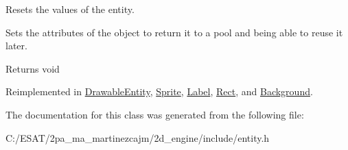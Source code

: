 Resets the values of the entity. 

Sets the attributes of the object to return it to a pool and being able to reuse it later.

\begin{DoxyReturn}{Returns}
void 
\end{DoxyReturn}


Reimplemented in \hyperlink{class_drawable_entity_aabea8715834f6cee7fd36b038d1a4843}{Drawable\+Entity}, \hyperlink{class_sprite_a26066db75daec637f436d4635418059a}{Sprite}, \hyperlink{class_label_aa6a355fe8daa25c3739affcf66d66f7f}{Label}, \hyperlink{class_rect_a85afbe7fde3b74bd81c07cc58d5c61bd}{Rect}, and \hyperlink{class_background_ad3559e8684aca155ae68d53374f3540d}{Background}.



The documentation for this class was generated from the following file\+:\begin{DoxyCompactItemize}
\item 
C\+:/\+E\+S\+A\+T/2pa\+\_\+ma\+\_\+martinezcajm/2d\+\_\+engine/include/entity.\+h\end{DoxyCompactItemize}
